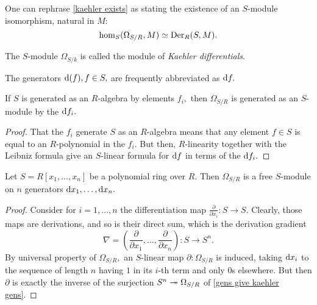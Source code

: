 \begin{note}
  \label{kaehler nat iso}
  One can rephrase \cref{kaehler exists} as stating the existence of an \(S\)-module isomorphism, natural in \(M:\)
  \[ \hom_S(\Omega_{S/{R}}, M) \simeq \operatorname{Der}_R(S, M).\]
\end{note}

\begin{df}
  The \(S\)-module \(\Omega_{S/{k}}\) is called the module of \emph{Kaehler differentials}.
\end{df}

The generators \(\text{d}(f), f \in S,\) are frequently abbreviated as \(\text{d} f.\)

\begin{prop}
  \label{gens give kaehler gens}
  If \(S\) is generated as an \(R\)-algebra by elements \(f_i,\) then \(\Omega_{S/{R}}\) is generated as an \(S\)-module by the \(\text{d} f_i.\)
\end{prop}
\begin{proof}
  That the \(f_i\) generate \(S\) as an \(R\)-algebra means that any element \(f \in S\) is equal to an \(R\)-polynomial in the \(f_i.\) But then, \(R\)-linearity together with the Leibniz formula give an \(S\)-linear formula for \(\text{d} f\) in terms of the \(\text{d} f_i.\)
\end{proof}

\begin{prop}
  Let \(S = R[x_1, \dotsc, x_n]\) be a polynomial ring over \(R.\) Then \(\Omega_{S/{R}}\) is a free \(S\)-module on \(n\) generators
  \(\text{d} x_1, \dotsc, \text{d} x_n.\)
\end{prop}
\begin{proof}
  Consider for \(i = 1, \dotsc, n\) the differentiation map
  \(\frac{\partial}{\partial x_i} \colon S \to S.\)
  Clearly, those maps are derivations, and so is their direct sum, which is the derivation gradient
  \[\nabla = (\frac{\partial}{\partial x_1}, \dotsc, \frac{\partial}{\partial x_n}) \colon S \to S^n.\]
  By universal property of \(\Omega_{S/{R}},\) an \(S\)-linear map \(\partial \colon \Omega_{S/{R}}\) is induced, taking \(\text{d} x_i\) to the sequence of length \(n\) having \(1\) in its \(i\)-th term and only \(0\)s elsewhere.
  But then \(\partial\) is exactly the inverse of the surjection \(S^n \twoheadrightarrow \Omega_{S/{R}}\) of \cref{gens give kaehler gens}.
\end{proof}

